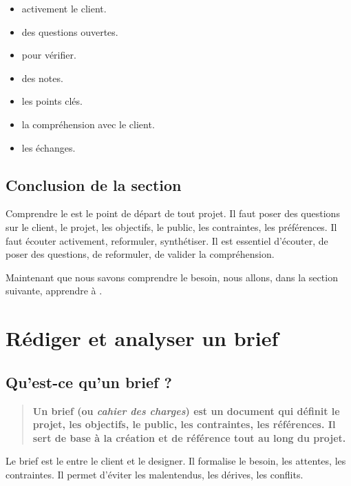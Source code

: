 \begin{itemize}
    \item {} activement le client.
    \item {} des questions ouvertes.
    \item {} pour vérifier.
    \item {} des notes.
    \item {} les points clés.
    \item {} la compréhension avec le client.
    \item {} les échanges.
\end{itemize}

\subsection*{Conclusion de la section}

Comprendre le  est le point de départ de tout projet. Il faut poser des questions sur le client, le projet, les objectifs, le public, les contraintes, les préférences. Il faut écouter activement, reformuler, synthétiser. Il est essentiel d'écouter, de poser des questions, de reformuler, de valider la compréhension.

Maintenant que nous savons comprendre le besoin, nous allons, dans la section suivante, apprendre à .

\section{Rédiger et analyser un brief}

\subsection{Qu'est-ce qu'un brief ?}

\begin{quote}
\textbf{Un brief (ou \emph{cahier des charges}) est un document qui définit le projet, les objectifs, le public, les contraintes, les références. Il sert de base à la création et de référence tout au long du projet.}
\end{quote}

Le brief est le  entre le client et le designer. Il formalise le besoin, les attentes, les contraintes. Il permet d'éviter les malentendus, les dérives, les conflits.

